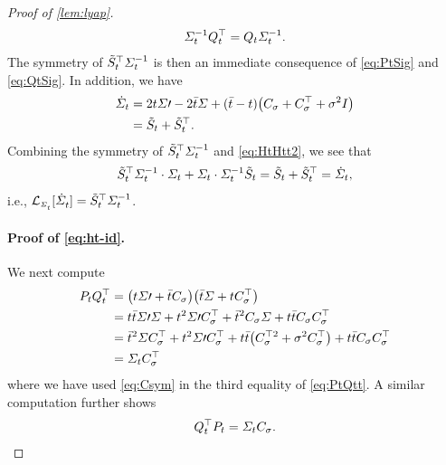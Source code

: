 \begin{proof}[Proof of \cref{lem:lyap}]
\begin{align}
\label{eq:QtSig}
\Sigma^{-1}_{t}Q_{t}^\top = Q_{t} \Sigma^{-1}_{t}.
\end{align}The symmetry of $\tilde{S}_{t}^\top\Sigma^{-1}_{t}$ is then an immediate consequence of \eqref{eq:PtSig} and \eqref{eq:QtSig}. In addition, we have
\begin{align}
\nn
\dSigcurve &= 2\ctime\Sigma\prime - 2 \ctimebar\Sigma + (\ctimebar-\ctime)\parens*{   \C +\C^\top  + \sdev^2\eye } \\
\label{eq:HtHtt2}
&=  \Ht + \Ht^\top.
\end{align}
Combining the symmetry of $\tilde{S}_{t}^\top\Sigma^{-1}_{t}$ and \eqref{eq:HtHtt2}, we see that
\begin{align}
\nonumber
\tilde{S}_{t}^\top\Sigma^{-1}_{t} \cdot \Sigma_{t} + \Sigma_{t} \cdot \Sigma^{-1}_{t} \tilde{S}_{t} = \tilde{S}_{t}+\tilde{S}_{t}^\top = \dot{\Sigma}_{t},
\end{align}
i.e., $\lyap = \Ht^\top\Sigcurveinv$.



\paragraph{Proof of \eqref{eq:ht-id}.}

We next compute
\begin{align}
\nn
\Pt \Qt^\top &= \parens*{\ctime \Sigma\prime + \ctimebar \C}\parens*{\ctimebar \Sigma + \ctime \C^\top} \\
\nn
&= \ctime\ctimebar\Sigma\prime\Sigma + \ctime^2\Sigma\prime\C^\top + \ctimebar^2\C\Sigma + \ctime\ctimebar\C\C^\top \\
\nn
&= \ctimebar^2\Sigma \C^\top + \ctime^2\Sigma\prime\C^\top+ \ctime\ctimebar \parens*{ \C^{\top 2}+ \sdev^2\C^\top }+ \ctime\ctimebar  \C\C^\top
\\
\label{eq:PtQtt}
&= \Sigcurve\C^\top
\end{align}
where we have used \eqref{eq:Csym} in the third equality of \eqref{eq:PtQtt}. A similar computation further shows 
\begin{align}
\label{eq:QttPt}
Q_{t}^\top P_{t} = \Sigma_{t}C_{\sigma}.
\end{align}


\end{proof}
